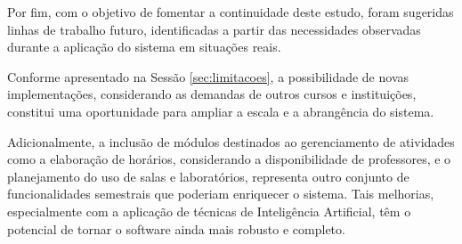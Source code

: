 Por fim, com o objetivo de fomentar a continuidade deste estudo, foram sugeridas linhas de trabalho futuro, identificadas a partir das necessidades observadas durante a aplicação do sistema em situações reais.

Conforme apresentado na Sessão \ref{sec:limitacoes}, a possibilidade de novas implementações, considerando as demandas de outros cursos e instituições, constitui uma oportunidade para ampliar a escala e a abrangência do sistema.

Adicionalmente, a inclusão de módulos destinados ao gerenciamento de atividades como a elaboração de horários, considerando a disponibilidade de professores, e o planejamento do uso de salas e laboratórios, representa outro conjunto de funcionalidades semestrais que poderiam enriquecer o sistema. Tais melhorias, especialmente com a aplicação de técnicas de Inteligência Artificial, têm o potencial de tornar o software ainda mais robusto e completo.